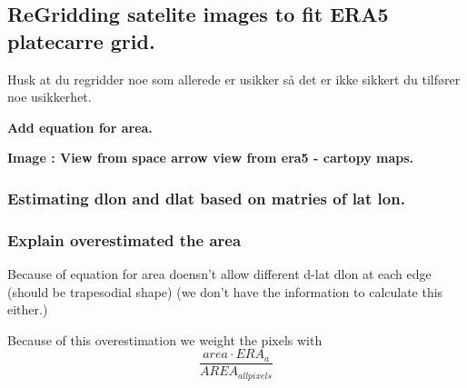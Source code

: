 \subsection{ReGridding satelite images to fit ERA5 platecarre grid.}

Husk at du regridder noe som allerede er usikker så det er ikke sikkert du tilfører noe usikkerhet. 

\textbf{Add equation for area.}

\textbf{Image : View from space arrow view from era5 - cartopy maps.}

\subsubsection{Estimating dlon and dlat based on matries of lat lon.}

\subsubsection{Explain overestimated the area}
Because of equation for area doensn't allow different d-lat dlon at each edge (should be trapesodial shape) (we don't have the information to calculate this either.)

Because of this overestimation we weight the pixels with 
\begin{equation}
     \frac{area \cdot ERA_a}{AREA_{allpixels} }
\end{equation}

